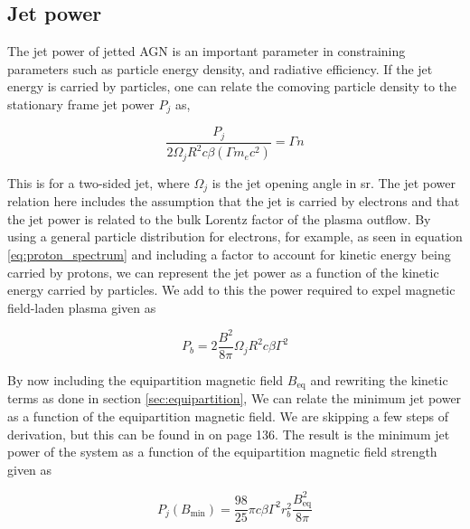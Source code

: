 


\subsection{Jet power}

The jet power of jetted AGN is an important parameter in constraining parameters such as particle energy density, and radiative efficiency. If the jet energy is carried by particles, one can relate the comoving particle density to the stationary frame jet power $P_j$ as,

\begin{equation}
    \frac{P_j}{2\Omega_j R^2 c \beta (\Gamma m_e c^2)} = \Gamma n
\end{equation}

This is for a two-sided jet, where $\Omega_j$ is the jet opening angle in sr. The jet power relation here includes the assumption that the jet is carried by electrons and that the jet power is related to the bulk Lorentz factor of the plasma outflow. By using a general particle distribution for electrons, for example, as seen in equation \ref{eq:proton_spectrum} and including a factor to account for kinetic energy being carried by protons, we can represent the jet power as a function of the kinetic energy carried by particles. We add to this the power required to expel magnetic field-laden plasma given as

\begin{equation}
    P_b = 2 \frac{B^2}{8\pi} \Omega_j R^2 c \beta \Gamma^2
\end{equation}

By now including the equipartition magnetic field $B_{\text{eq}}$ and rewriting the kinetic terms as done in section \ref{sec:equipartition}, We can relate the minimum jet power as a function of the equipartition magnetic field. We are skipping a few steps of derivation, but this can be found in \cite{BHradiation} on page 136. The result is the minimum jet power of the system as a function of the equipartition magnetic field strength given as

\begin{equation}
    P_j(B_{\text{min}}) = \frac{98}{25}\pi c \beta \Gamma^2 r_b^2 \frac{B_{\text{eq}}^2}{8 \pi}
\end{equation}

